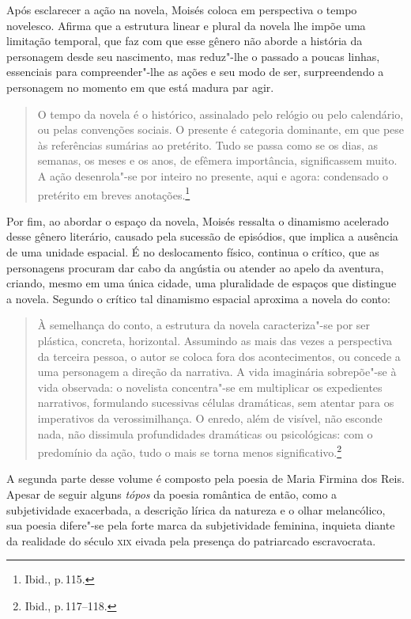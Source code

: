 Após esclarecer a ação na novela, Moisés coloca em perspectiva o tempo novelesco. Afirma que a estrutura linear e plural da novela lhe impõe uma limitação temporal, que faz com que esse gênero não aborde a história da personagem desde seu nascimento, mas reduz"-lhe o passado a poucas linhas, essenciais para compreender"-lhe as ações e seu modo de ser, surpreendendo a personagem no momento em que está madura par agir.

\begin{quote}
O tempo da novela é o histórico, assinalado pelo relógio ou pelo calendário, ou pelas convenções sociais. O presente é categoria dominante, em que pese às referências sumárias ao pretérito. Tudo se passa como se os dias, as semanas, os meses e os anos, de efêmera importância, significassem muito. A ação desenrola"-se por inteiro no presente, aqui e agora: condensado o pretérito em breves anotações.\footnote{Ibid., p.\,115.}
\end{quote}

Por fim, ao abordar o espaço da novela, Moisés ressalta o dinamismo acelerado desse gênero literário, causado pela sucessão de episódios, que implica a ausência de uma unidade espacial. É no deslocamento físico, continua o crítico, que as personagens procuram dar cabo da angústia ou atender ao apelo da aventura, criando, mesmo em uma única cidade, uma pluralidade de espaços que distingue a novela. Segundo o crítico tal dinamismo espacial aproxima a novela do conto:

\begin{quote}
À semelhança do conto, a estrutura da novela caracteriza"-se por ser plástica, concreta, horizontal. Assumindo as mais das vezes a perspectiva da terceira pessoa, o autor se coloca fora dos acontecimentos, ou concede a uma personagem a direção da narrativa. A vida imaginária sobrepõe"-se à vida observada: o novelista concentra"-se em multiplicar os expedientes narrativos, formulando sucessivas células dramáticas, sem atentar para os imperativos da verossimilhança. O enredo, além de visível, não esconde nada, não dissimula profundidades dramáticas ou psicológicas: com o predomínio da ação, tudo o mais se torna menos significativo.\footnote{Ibid., p.\,117--118.}
\end{quote}

A segunda parte desse volume é composto pela poesia de Maria Firmina dos Reis.
Apesar de seguir alguns \textit{tópos} da poesia romântica de então, como a subjetividade exacerbada, a descrição lírica da natureza e o olhar melancólico, 
sua poesia difere"-se pela forte marca da subjetividade feminina, inquieta diante da realidade do século \textsc{xix} eivada pela presença do patriarcado escravocrata.

